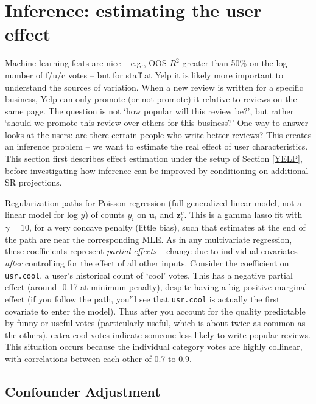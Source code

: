 \documentclass[12pt]{article}
\newcommand{\bm}[1]{\mathbf{#1}}
\newcommand{\cd}[1]{{\tt#1}}
\begin{document}
\section{Inference: estimating the user effect}
\label{INFER}

Machine learning feats are nice -- e.g., OOS $R^2$ greater than 50\% on the
log number of f/u/c votes -- but for staff at Yelp it is likely more important
to understand the sources of variation.  When a new review is written for a
specific business, Yelp can only promote (or not promote) it relative to
reviews on the same page.  The question is not `how popular will this review
be?', but rather `should we promote this review over others for this
business?'  One way to answer looks at the users: are there certain people who
write better reviews?  This creates an inference problem -- we want to
estimate the real effect of user characteristics. This section first describes
effect estimation under the setup of Section \ref{YELP}, before investigating how
inference can be improved by conditioning on additional SR projections.

Regularization paths for
Poisson regression (full generalized linear model, not a linear model for
log $y$) of  counts $y_i$ on   $\bm{u}_i$ and
$\bm{z}^v_i$.  This is a gamma lasso fit with $\gamma =10$, for a very concave
penalty (little bias), such that estimates at the end of the path
are near the corresponding MLE.  As in any multivariate regression, these coefficients
represent {\it partial effects} --  change due to
 individual covariates {\it after} controlling for the effect of all other
inputs.  Consider the coefficient on \cd{usr.cool}, a user's historical
count of `cool' votes.  This has a negative partial effect (around -0.17 at
minimum penalty), despite having a big positive marginal effect (if you follow
the path, you'll see that \cd{usr.cool} is actually the first covariate to
enter the model).  Thus after you account for the quality
predictable by funny or useful votes (particularly useful, which is about
twice as common as the others), extra cool votes indicate someone less likely
to write popular reviews.  This situation occurs because the individual
category votes are highly collinear, with correlations between each other of
0.7 to 0.9.

\subsection{Confounder Adjustment}
\end{document}
